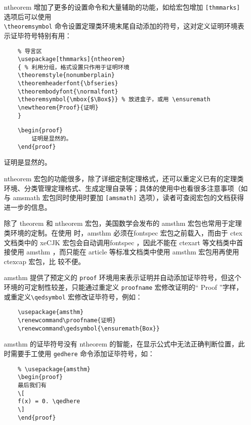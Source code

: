 ntheorem 增加了更多的设置命令和大量辅助的功能，如给宏包增加 \verb|[thmmarks]| 选项后可以使用\\ \verb|\theoremsymbol| 命令设置定理类环境末尾自动添加的符号，这对定义证明环境表示证毕符号特别有用：

\begin{lstlisting}
    % 导言区
    \usepackage[thmmarks]{ntheorem}
    { % 利用分组，格式设置只作用于证明环境
    \theoremstyle{nonumberplain}
    \theoremheaderfont{\bfseries}
    \theorembodyfont{\normalfont}
    \theoremsymbol{\mbox{$\Box$}} % 放进盒子，或用 \ensuremath
    \newtheorem{Proof}{证明}
    }
\end{lstlisting}

\begin{minipage}[t]{0.45\textwidth}
\begin{lstlisting}
    \begin{proof}
        证明是显然的。
    \end{proof}
\end{lstlisting}
\end{minipage}
\hfill
\begin{minipage}[t]{0.45\textwidth}
    \begin{Proof}
        证明是显然的。
    \end{Proof}
\end{minipage}

ntheorem 宏包的功能很多，除了详细定制定理格式，还可以重定义已有的定理类环境、分类管理定理格式、生成定理自录等；具体的使用中也看很多注意事项（如与 amsmath 宏包同时使用时要加 \verb|[amsmath]| 选项），读者可查阅宏包的文档获得进一步的信息。

除了 theorem 和 ntheorem 宏包，美国数学会发布的 amsthm 宏包也常用于定理类环境的定制。在使用 \XeTeX 时，amsthm 必须在fontspec 宏包之前载入，而由于 ctex 文档类中的 xeCJK 宏包会自动调用fontspec ，因此不能在 ctexart 等文档类中首接使用 amsthm ，而只能在 article 等标准文档类中使用 amsthm 宏包用再使用 ctexcap 宏包，比
较不便。

amsthm 提供了预定义的 \verb|proof| 环境用来表示证明并自动添加证毕符号，但这个环境的可定制性较差，只能通过重定义 \verb|proofname| 宏修改证明的“ Proof ”字样，或重定义\verb|\qedsymbol| 宏修改证毕符号，例如：
\begin{lstlisting}
    \usepackage{amsthm}
    \renewcommand\proofname{证明}
    \renewcommand\gedsymbol{\ensuremath{Box}}
\end{lstlisting}


amsthm 的证毕符号没有 ntheorem 的智能，在显示公式中无法正确判断位置，此时需要手工使用 \verb|gedhere| 命令添加证毕符号，如：
\begin{lstlisting}
    % \usepackage{amsthm}
    \begin{proof}
    最后我们有
    \[
    f(x) = 0. \qedhere
    \]
    \end{proof}
\end{lstlisting}

